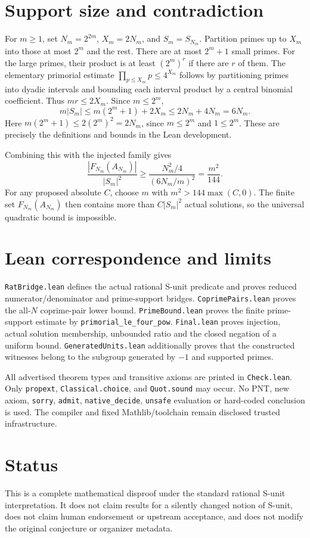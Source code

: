\documentclass[10pt,a4paper]{article}
\begin{document}
\section{Support size and contradiction}
For $m\geq1$, set $N_m=2^{2m}$, $X_m=2N_m$, and $S_m=S_{N_m}$.
Partition primes up to $X_m$
into those at most $2^m$ and the rest. There are at most $2^m+1$ small primes.
For the large primes, their product is at least $(2^m)^r$ if there are $r$ of them.
The elementary primorial estimate $\prod_{p\leq X_m}p\leq4^{X_m}$ follows by
partitioning primes into dyadic intervals and bounding each interval product by
a central binomial coefficient. Thus $mr\leq2X_m$. Since $m\leq2^m$,
\[
m|S_m|\leq m(2^m+1)+2X_m\leq2N_m+4N_m=6N_m.
\]
Here $m(2^m+1)\leq 2(2^m)^2=2N_m$, since $m\leq2^m$ and $1\leq2^m$.
These are precisely the definitions and bounds in the Lean development.

Combining this with the injected family gives
\[
\frac{|F_{N_m}(A_{N_m})|}{|S_m|^2}
\geq \frac{N_m^2/4}{(6N_m/m)^2}=\frac{m^2}{144}.
\]
For any proposed absolute $C$, choose $m$ with $m^2>144\max(C,0)$.
The finite set $F_{N_m}(A_{N_m})$ then contains more than $C|S_m|^2$ actual
solutions, so the universal quadratic bound is impossible.

\section{Lean correspondence and limits}
\texttt{RatBridge.lean} defines the actual rational S-unit predicate and proves reduced
numerator/denominator and prime-support bridges. \texttt{CoprimePairs.lean}
proves the all-$N$ coprime-pair lower bound. \texttt{PrimeBound.lean} proves the finite
prime-support estimate by \texttt{primorial\_le\_four\_pow}. \texttt{Final.lean} proves injection,
actual solution membership, unbounded ratio and the closed negation of a uniform
bound. \texttt{GeneratedUnits.lean} additionally proves that the constructed
witnesses belong to the subgroup generated by $-1$ and supported primes.

All advertised theorem types and transitive axioms are printed in \texttt{Check.lean}.
Only \texttt{propext}, \texttt{Classical.choice}, and \texttt{Quot.sound} may occur. No PNT, new axiom,
\texttt{sorry}, \texttt{admit}, \texttt{native\_decide}, \texttt{unsafe} evaluation or hard-coded conclusion is used.
The compiler and fixed Mathlib/toolchain remain disclosed trusted infrastructure.

\section{Status}
This is a complete mathematical disproof under the standard rational S-unit
interpretation. It does not claim results for a silently changed notion of S-unit,
does not claim human endorsement or upstream acceptance, and does not modify the
original conjecture or organizer metadata.
\end{document}
